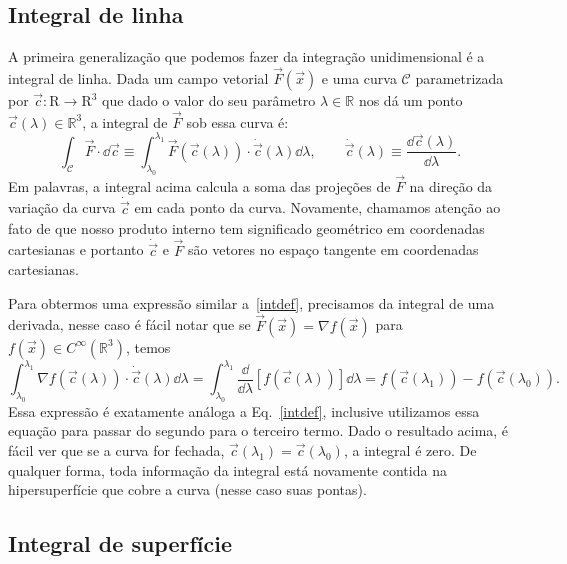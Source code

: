 \subsection{Integral de linha}
\label{sec:intline}

A primeira generalização que podemos fazer da integração unidimensional é a
integral de linha. Dada um campo vetorial $\vec{F}(\vec{x})$ e uma curva
$\mathcal{C}$ parametrizada por $\vec{c}:\mathrm{R}\to\mathrm{R}^3$ que dado o
valor do seu parâmetro $\lambda\in\mathbb{R}$ nos dá um ponto
$\vec{c}(\lambda) \in \mathbb{R}^3$, a integral de $\vec{F}$ sob essa curva é:
\begin{equation}
	\int_\mathcal{C}\vec{F}\cdot\dd \vec{c} \equiv  \int_{\lambda_0}^{\lambda_1}\vec{F}(\vec{c}(\lambda))\cdot \dot{\vec{c}}(\lambda)\dd \lambda, \qquad \dot{\vec{c}}(\lambda) \equiv \frac{\dd \vec{c}(\lambda)}{\dd \lambda}.
\end{equation}
Em palavras, a integral acima calcula a soma das projeções de $\vec{F}$ na
direção da variação da curva $\dot{\vec{c}}$ em cada ponto da curva. Novamente,
chamamos atenção ao fato de que nosso produto interno tem significado geométrico
em coordenadas cartesianas e portanto $\dot{\vec{c}}$ e $\vec{F}$ são vetores no
espaço tangente em coordenadas cartesianas.

Para obtermos uma expressão similar a~\eqref{intdef}, precisamos da integral de
uma derivada, nesse caso é fácil notar que se $\vec{F}(\vec{x}) = \nabla f(\vec{x})$
para $f(\vec{x}) \in C^{\infty}(\mathbb{R}^3)$, temos
\begin{equation}
	\int_{\lambda_0}^{\lambda_1}\nabla f(\vec{c}(\lambda))\cdot \dot{\vec{c}}(\lambda)\dd \lambda = \int_{\lambda_0}^{\lambda_1}\frac{\dd }{\dd \lambda}\left[f(\vec{c}(\lambda))\right]\dd \lambda = f(\vec{c}(\lambda_1)) - f(\vec{c}(\lambda_0)).
\end{equation}
Essa expressão é exatamente análoga a Eq.~\eqref{intdef}, inclusive utilizamos
essa equação para passar do segundo para o terceiro termo. Dado o resultado
acima, é fácil ver que se a curva for fechada, $\vec{c}(\lambda_1) =
	\vec{c}(\lambda_0)$, a integral é zero. De qualquer forma, toda informação da
integral está novamente contida na hipersuperfície que cobre a curva (nesse caso
suas pontas).

\subsection{Integral de superfície}

